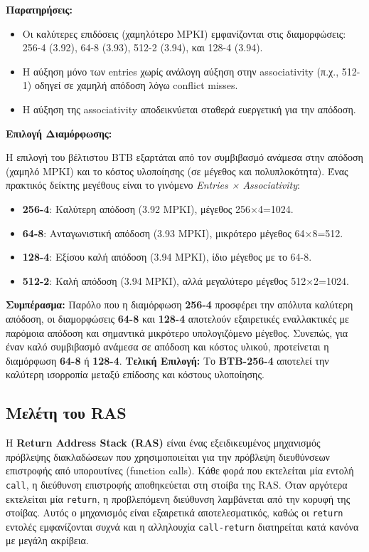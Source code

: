\documentclass{article}
\begin{document}
\vspace{0.3cm} \textbf{Παρατηρήσεις:} \begin{itemize} \item Οι καλύτερες επιδόσεις (χαμηλότερο MPKI) εμφανίζονται στις διαμορφώσεις: 256-4 (3.92), 64-8 (3.93), 512-2 (3.94), και 128-4 (3.94). \item Η αύξηση μόνο των entries χωρίς ανάλογη αύξηση στην associativity (π.χ., 512-1) οδηγεί σε χαμηλή απόδοση λόγω conflict misses. \item Η αύξηση της associativity αποδεικνύεται σταθερά ευεργετική για την απόδοση. \end{itemize}

\vspace{0.3cm} \textbf{Επιλογή Διαμόρφωσης:}

Η επιλογή του βέλτιστου BTB εξαρτάται από τον συμβιβασμό ανάμεσα στην απόδοση (χαμηλό MPKI) και το κόστος υλοποίησης (σε μέγεθος και πολυπλοκότητα). Ένας πρακτικός δείκτης μεγέθους είναι το γινόμενο \textit{Entries × Associativity}:

\begin{itemize} \item \textbf{256-4}: Καλύτερη απόδοση (3.92 MPKI), μέγεθος 256×4=1024. \item \textbf{64-8}: Ανταγωνιστική απόδοση (3.93 MPKI), μικρότερο μέγεθος 64×8=512. \item \textbf{128-4}: Εξίσου καλή απόδοση (3.94 MPKI), ίδιο μέγεθος με το 64-8. \item \textbf{512-2}: Καλή απόδοση (3.94 MPKI), αλλά μεγαλύτερο μέγεθος 512×2=1024. \end{itemize}

\textbf{Συμπέρασμα:}
Παρόλο που η διαμόρφωση \textbf{256-4} προσφέρει την απόλυτα καλύτερη απόδοση, οι διαμορφώσεις \textbf{64-8} και \textbf{128-4} αποτελούν εξαιρετικές εναλλακτικές με παρόμοια απόδοση και σημαντικά μικρότερο υπολογιζόμενο μέγεθος. Συνεπώς, για έναν καλό συμβιβασμό ανάμεσα σε απόδοση και κόστος υλικού, προτείνεται η διαμόρφωση \textbf{64-8} ή \textbf{128-4}.
\vspace{0.3cm}
\noindent \textbf{Τελική Επιλογή:} Το \textbf{BTB-256-4} αποτελεί την καλύτερη ισορροπία μεταξύ επίδοσης και κόστους υλοποίησης.

\subsection{Μελέτη του RAS}
Η \textbf{Return Address Stack (RAS)} είναι ένας εξειδικευμένος μηχανισμός πρόβλεψης διακλαδώσεων που χρησιμοποιείται για την πρόβλεψη διευθύνσεων επιστροφής από υπορουτίνες (function calls). Κάθε φορά που εκτελείται μία εντολή \texttt{call}, η διεύθυνση επιστροφής αποθηκεύεται στη στοίβα της RAS. Όταν αργότερα εκτελείται μία \texttt{return}, η προβλεπόμενη διεύθυνση λαμβάνεται από την κορυφή της στοίβας. Αυτός ο μηχανισμός είναι εξαιρετικά αποτελεσματικός, καθώς οι \texttt{return} εντολές εμφανίζονται συχνά και η αλληλουχία \texttt{call-return} διατηρείται κατά κανόνα με μεγάλη ακρίβεια.
\end{document}

